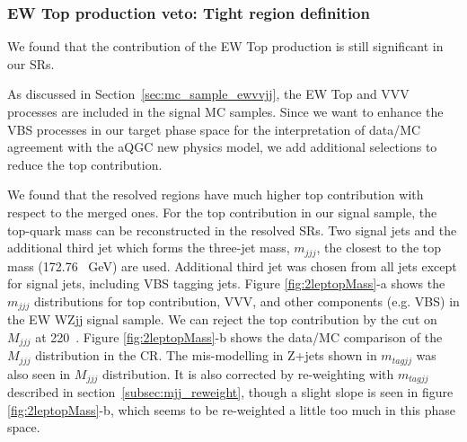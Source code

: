 \subsubsection{EW Top production veto: Tight region definition}
\label{subsec:topveto_selection}

We found that the contribution of the EW Top production is still significant in our SRs. 

As discussed in Section~\ref{sec:mc_sample_ewvvjj},
the EW Top and VVV processes are included in the signal MC samples. Since we want to enhance the VBS processes in our target phase space for the interpretation of data/MC agreement with the aQGC new physics model, we add additional selections to reduce the top contribution.


\label{subsec:LooseTightRegion}

We found that the resolved regions have much higher top contribution with respect to the merged ones.
For the top contribution in our signal sample, the top-quark mass can be reconstructed in the resolved SRs.
Two signal jets and the additional third jet which forms the three-jet mass, $m_{jjj}$, 
the closest to the top mass (172.76 \ GeV) are used. 
Additional third jet was chosen from all jets except for signal jets, including VBS tagging jets.
Figure \ref{fig:2leptopMass}-a shows the $m_{jjj}$ distributions for top contribution, VVV, and other components (e.g. VBS) in the EW WZjj signal sample.
We can reject the top contribution by the cut on $M_{jjj}$ at 220~\GeV.
Figure \ref{fig:2leptopMass}-b shows the data/MC comparison of the $M_{jjj}$ distribution in the \tlep \Zjets CR.
The mis-modelling in Z+jets shown in $m_{tagjj}$ was also seen in $M_{jjj}$ distribution. It is also corrected by re-weighting with $m_{tagjj}$ described in section~\ref{subsec:mjj_reweight}, though a slight slope is seen in figure \ref{fig:2leptopMass}-b, which seems to be re-weighted a little too much in this phase space.

